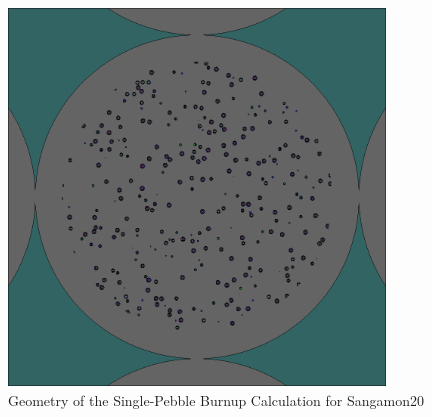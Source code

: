 \begin{figure}[H]
\centering
\includegraphics[width = 10cm]{figures/burn-20.png}
\caption{Geometry of the Single-Pebble Burnup Calculation for Sangamon20}
\label{fig:burn-20}
\end{figure}
